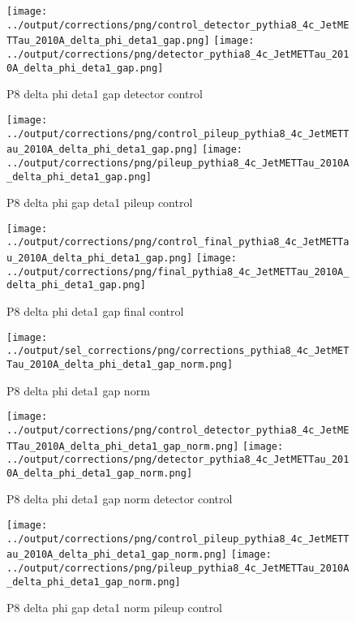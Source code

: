 \documentclass[11pt]{book}
\begin{document}
\begin{figure}[ht]
\centering
\texttt{[image: ../output/corrections/png/control\_detector\_pythia8\_4c\_JetMETTau\_2010A\_delta\_phi\_deta1\_gap.png]}
\texttt{[image: ../output/corrections/png/detector\_pythia8\_4c\_JetMETTau\_2010A\_delta\_phi\_deta1\_gap.png]}
\caption{P8 delta phi deta1 gap detector control}
\label{fig:p8_JetMETTau_2010A_delta_phi_deta1_gap_detector_control}
\end{figure}

\begin{figure}[ht]
\centering
\texttt{[image: ../output/corrections/png/control\_pileup\_pythia8\_4c\_JetMETTau\_2010A\_delta\_phi\_deta1\_gap.png]}
\texttt{[image: ../output/corrections/png/pileup\_pythia8\_4c\_JetMETTau\_2010A\_delta\_phi\_deta1\_gap.png]}
\caption{P8 delta phi gap deta1 pileup control}
\label{fig:p8_JetMETTau_2010A_delta_phi_deta1_gap_pileup_control}
\end{figure}


\begin{figure}[ht]
\centering
\texttt{[image: ../output/corrections/png/control\_final\_pythia8\_4c\_JetMETTau\_2010A\_delta\_phi\_deta1\_gap.png]}
\texttt{[image: ../output/corrections/png/final\_pythia8\_4c\_JetMETTau\_2010A\_delta\_phi\_deta1\_gap.png]}
\caption{P8 delta phi deta1 gap final control}
\label{fig:p8_JetMETTau_2010A_delta_phi_deta1_gap_final_control}
\end{figure}

\begin{figure}[ht]
\centering
\texttt{[image: ../output/sel\_corrections/png/corrections\_pythia8\_4c\_JetMETTau\_2010A\_delta\_phi\_deta1\_gap\_norm.png]}
\caption{P8 delta phi deta1 gap norm}
\label{fig:p8_JetMETTau_2010A_delta_phi_deta1_gap_norm}
\end{figure}

\begin{figure}[ht]
\centering
\texttt{[image: ../output/corrections/png/control\_detector\_pythia8\_4c\_JetMETTau\_2010A\_delta\_phi\_deta1\_gap\_norm.png]}
\texttt{[image: ../output/corrections/png/detector\_pythia8\_4c\_JetMETTau\_2010A\_delta\_phi\_deta1\_gap\_norm.png]}
\caption{P8 delta phi deta1 gap norm detector control}
\label{fig:p8_JetMETTau_2010A_delta_phi_deta1_gap_norm_detector_control}
\end{figure}

\begin{figure}[ht]
\centering
\texttt{[image: ../output/corrections/png/control\_pileup\_pythia8\_4c\_JetMETTau\_2010A\_delta\_phi\_deta1\_gap\_norm.png]}
\texttt{[image: ../output/corrections/png/pileup\_pythia8\_4c\_JetMETTau\_2010A\_delta\_phi\_deta1\_gap\_norm.png]}
\caption{P8 delta phi gap deta1 norm pileup control}
\label{fig:p8_JetMETTau_2010A_delta_phi_deta1_gap_norm_pileup_control}
\end{figure}
\end{document}
